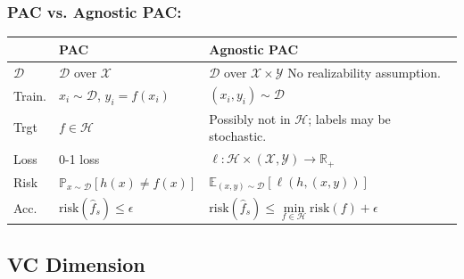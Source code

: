 \subsubsection{PAC vs. Agnostic PAC:}

\setlength{\tabcolsep}{2pt}
\renewcommand{\arraystretch}{1.3}
\hspace*{-0.8em}\begin{tabular}{|l|m{2.15cm}|m{2.72cm}|}
    \hline
    \textbf{}     & \textbf{PAC}                             & \textbf{Agnostic PAC}                                                                          \\
    \hline
    $\mathcal{D}$ & $\mathcal{D}$ over $\mathcal{X}$         & $\mathcal{D}$ over $\mathcal{X} \times \mathcal{Y}$ No realizability assumption.               \\
    \hline
    Train.        & $x_i \sim \mathcal{D}$, $y_i = f(x_i)$   & $(x_i, y_i) \sim \mathcal{D}$                                                                  \\
    \hline
    Trgt          & $f \in \mathcal{H}$                      & Possibly not in $\mathcal{H}$; labels may be stochastic.                                       \\
    \hline
    Loss          & 0-1 loss & $\ell : \mathcal{H} \times (\mathcal{X}, \mathcal{Y}) \to \mathbb{R}_+$ \\
    \hline
    Risk          & $\mathbb{P}_{x \sim \mathcal{D}}[h(x) \neq f(x)]$ & $\mathbb{E}_{(x,y) \sim \mathcal{D}}[\ell(h, (x, y))]$ \\
    \hline
    Acc.          & $\mathrm{risk}(\hat{f}_s) \leq \epsilon$ & $\mathrm{risk}(\hat{f}_s) \leq \underset{f \in \mathcal{H}}{\min} \mathrm{risk}(f) + \epsilon$ \\
    \hline
\end{tabular}

\subsection{VC Dimension}